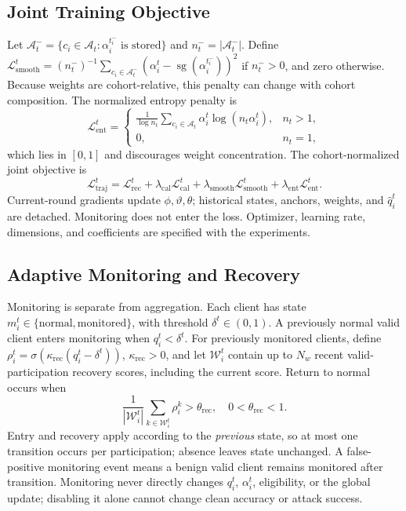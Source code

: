 \subsection{Joint Training Objective}
\label{subsec:method_training}

Let $\mathcal A_t^-=\{c_i\in\mathcal A_t:\alpha_i^{t_i^-}\text{ is stored}\}$ and $n_t^-=|\mathcal A_t^-|$. Define $\mathcal L_{\mathrm{smooth}}^t=(n_t^-)^{-1}\sum_{c_i\in\mathcal A_t^-}(\alpha_i^t-\operatorname{sg}(\alpha_i^{t_i^-}))^2$ if $n_t^->0$, and zero otherwise. Because weights are cohort-relative, this penalty can change with cohort composition. The normalized entropy penalty is
\begin{equation}
\mathcal L_{\mathrm{ent}}^t=\begin{cases}\displaystyle\frac1{\log n_t}\sum_{c_i\in\mathcal A_t}\alpha_i^t\log(n_t\alpha_i^t),&n_t>1,\\[1ex]0,&n_t=1,\end{cases}
\label{eq:method_entropy}
\end{equation}
which lies in $[0,1]$ and discourages weight concentration. The cohort-normalized joint objective is
\begin{equation}
\mathcal L_{\mathrm{traj}}^t=\mathcal L_{\mathrm{rec}}^t+\lambda_{\mathrm{cal}}\mathcal L_{\mathrm{cal}}^t+\lambda_{\mathrm{smooth}}\mathcal L_{\mathrm{smooth}}^t+\lambda_{\mathrm{ent}}\mathcal L_{\mathrm{ent}}^t.
\label{eq:method_loss}
\end{equation}
Current-round gradients update $\phi,\vartheta,\theta$; historical states, anchors, weights, and $\widehat q_i^t$ are detached. Monitoring does not enter the loss. Optimizer, learning rate, dimensions, and coefficients are specified with the experiments.

\subsection{Adaptive Monitoring and Recovery}
\label{subsec:method_recovery}

Monitoring is separate from aggregation. Each client has state $m_i^t\in\{\mathrm{normal},\mathrm{monitored}\}$, with threshold $\delta^t\in(0,1)$. A previously normal valid client enters monitoring when $q_i^t<\delta^t$. For previously monitored clients, define $\rho_i^t=\sigma(\kappa_{\mathrm{rec}}(q_i^t-\delta^t))$, $\kappa_{\mathrm{rec}}>0$, and let $\mathcal W_i^t$ contain up to $N_w$ recent valid-participation recovery scores, including the current score. Return to normal occurs when
\begin{equation}
\frac1{|\mathcal W_i^t|}\sum_{k\in\mathcal W_i^t}\rho_i^k>\theta_{\mathrm{rec}},\quad 0<\theta_{\mathrm{rec}}<1.
\label{eq:method_recovery}
\end{equation}
Entry and recovery apply according to the \emph{previous} state, so at most one transition occurs per participation; absence leaves state unchanged. A false-positive monitoring event means a benign valid client remains monitored after transition. Monitoring never directly changes $q_i^t$, $\alpha_i^t$, eligibility, or the global update; disabling it alone cannot change clean accuracy or attack success.

